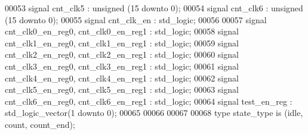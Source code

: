 \begin{DoxyCode}
00053 \textcolor{keywordflow}{signal} \textcolor{vhdlchar}{cnt_clk5}             \textcolor{vhdlchar}{:} \textcolor{comment}{unsigned} \textcolor{vhdlchar}{(}\textcolor{vhdllogic}{}\textcolor{vhdllogic}{15} \textcolor{keywordflow}{downto} \textcolor{vhdllogic}{}\textcolor{vhdllogic}{0}\textcolor{vhdlchar}{)};
00054 \textcolor{keywordflow}{signal} \textcolor{vhdlchar}{cnt_clk6}             \textcolor{vhdlchar}{:} \textcolor{comment}{unsigned} \textcolor{vhdlchar}{(}\textcolor{vhdllogic}{}\textcolor{vhdllogic}{15} \textcolor{keywordflow}{downto} \textcolor{vhdllogic}{}\textcolor{vhdllogic}{0}\textcolor{vhdlchar}{)};
00055 \textcolor{keywordflow}{signal} \textcolor{vhdlchar}{cnt_clk_en}               \textcolor{vhdlchar}{:} \textcolor{comment}{std\_logic}; 
00056 
00057 \textcolor{keywordflow}{signal} \textcolor{vhdlchar}{cnt_clk0_en_reg0}\textcolor{vhdlchar}{,} \textcolor{vhdlchar}{cnt_clk0_en_reg1} \textcolor{vhdlchar}{:} \textcolor{comment}{std\_logic};
00058 \textcolor{keywordflow}{signal} \textcolor{vhdlchar}{cnt_clk1_en_reg0}\textcolor{vhdlchar}{,} \textcolor{vhdlchar}{cnt_clk1_en_reg1} \textcolor{vhdlchar}{:} \textcolor{comment}{std\_logic};
00059 \textcolor{keywordflow}{signal} \textcolor{vhdlchar}{cnt_clk2_en_reg0}\textcolor{vhdlchar}{,} \textcolor{vhdlchar}{cnt_clk2_en_reg1} \textcolor{vhdlchar}{:} \textcolor{comment}{std\_logic};
00060 \textcolor{keywordflow}{signal} \textcolor{vhdlchar}{cnt_clk3_en_reg0}\textcolor{vhdlchar}{,} \textcolor{vhdlchar}{cnt_clk3_en_reg1} \textcolor{vhdlchar}{:} \textcolor{comment}{std\_logic};
00061 \textcolor{keywordflow}{signal} \textcolor{vhdlchar}{cnt_clk4_en_reg0}\textcolor{vhdlchar}{,} \textcolor{vhdlchar}{cnt_clk4_en_reg1} \textcolor{vhdlchar}{:} \textcolor{comment}{std\_logic};
00062 \textcolor{keywordflow}{signal} \textcolor{vhdlchar}{cnt_clk5_en_reg0}\textcolor{vhdlchar}{,} \textcolor{vhdlchar}{cnt_clk5_en_reg1} \textcolor{vhdlchar}{:} \textcolor{comment}{std\_logic};
00063 \textcolor{keywordflow}{signal} \textcolor{vhdlchar}{cnt_clk6_en_reg0}\textcolor{vhdlchar}{,} \textcolor{vhdlchar}{cnt_clk6_en_reg1} \textcolor{vhdlchar}{:} \textcolor{comment}{std\_logic};
00064 \textcolor{keywordflow}{signal} \textcolor{vhdlchar}{test_en_reg}          \textcolor{vhdlchar}{:} \textcolor{comment}{std\_logic\_vector}\textcolor{vhdlchar}{(}\textcolor{vhdllogic}{}\textcolor{vhdllogic}{1} \textcolor{keywordflow}{downto} \textcolor{vhdllogic}{}\textcolor{vhdllogic}{0}\textcolor{vhdlchar}{)};
00065 
00066 
00067 
00068 \textcolor{keywordflow}{type} \textcolor{vhdlchar}{state_type} \textcolor{keywordflow}{is} \textcolor{vhdlchar}{(}\textcolor{vhdlchar}{idle}\textcolor{vhdlchar}{,} \textcolor{vhdlchar}{count}\textcolor{vhdlchar}{,} \textcolor{vhdlchar}{count\_end}\textcolor{vhdlchar}{)};

\end{DoxyCode}
